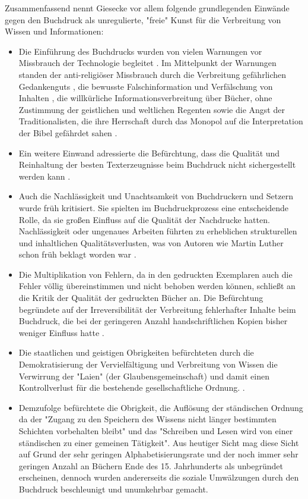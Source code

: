 Zusammenfassend nennt Giesecke vor allem folgende grundlegenden Einwände gegen den Buchdruck als unregulierte, "freie" Kunst \cite{giesecke_1991_buchdruck} für die Verbreitung von Wissen und Informationen:
\begin{itemize}
\item Die Einführung des Buchdrucks wurden von vielen Warnungen vor Missbrauch der Technologie begleitet \cite{lange2008medienwettbewerb}. Im Mittelpunkt der Warnungen standen der anti-religiöser Missbrauch durch die Verbreitung gefährlichen Gedankenguts \cite{kruse2003multimedia}, die bewusste Falschinformation und Verfälschung von Inhalten \cite{sprachgeschichte_1998_besch}, die willkürliche Informationsverbreitung über Bücher, ohne Zustimmung der geistlichen und weltlichen Regenten \cite{rother_2002_siebenbuergen} sowie die Angst der Traditionalisten, die ihre Herrschaft durch das Monopol auf die Interpretation der Bibel gefährdet sahen \cite{lange2008medienwettbewerb}.
\item Ein weitere Einwand adressierte die Befürchtung, dass die Qualität und Reinhaltung der besten Texterzeugnisse beim Buchdruck nicht sichergestellt werden kann \cite{giesecke_1991_buchdruck}.
\item Auch die Nachlässigkeit und Unachtsamkeit von Buchdruckern und Setzern wurde früh kritisiert. Sie spielten im Buchdruckprozess eine entscheidende Rolle, da sie großen Einfluss auf die Qualität der Nachdrucke hatten. Nachlässigkeit oder ungenaues Arbeiten führten zu erheblichen strukturellen und inhaltlichen Qualitätsverlusten, was von Autoren wie Martin Luther schon früh beklagt worden war \cite{sprachgeschichte_1998_besch} \cite{stober_2014_pressegeschichte} \cite{luther_1876}.
\item Die Multiplikation von Fehlern, da in den gedruckten Exemplaren auch die Fehler völlig übereinstimmen und nicht behoben werden können, schließt an die Kritik der Qualität der gedruckten Bücher an. Die Befürchtung begründete auf der Irreversibilität der Verbreitung fehlerhafter Inhalte beim Buchdruck, die bei der geringeren Anzahl handschriftlichen Kopien bisher weniger Einfluss hatte \cite{kittler_2004}.
\item Die staatlichen und geistigen Obrigkeiten befürchteten durch die Demokratisierung der Vervielfältigung und Verbreitung von Wissen die Verwirrung der "Laien" (der Glaubensgemeinschaft) und damit einen Kontrollverlust für die bestehende gesellschaftliche Ordnung. \cite{giesecke_1991_buchdruck}.
\item Demzufolge befürchtete die Obrigkeit, die Auflösung der ständischen Ordnung da der "Zugang zu den Speichern des Wissens nicht länger bestimmten Schichten vorbehalten bleibt" und das "Schreiben und Lesen wird von einer ständischen zu einer gemeinen Tätigkeit". Aus heutiger Sicht mag diese Sicht auf Grund der sehr geringen Alphabetisierungsrate und der noch immer sehr geringen Anzahl an Büchern Ende des 15. Jahrhunderts als unbegründet erscheinen, dennoch wurden andererseits die soziale Umwälzungen durch den Buchdruck beschleunigt und unumkehrbar gemacht. \cite{giesecke_1991_buchdruck}

\end{itemize}
